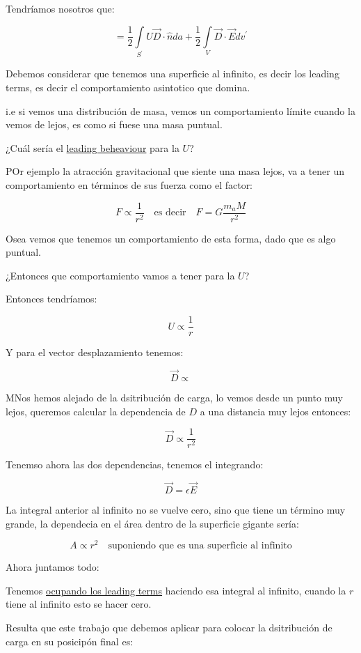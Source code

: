 \documentclass{article}
\begin{document}
Tendríamos nosotros que:


\[  = \frac{1}{2} \int\limits_{S^{\prime}} U\vec{D} \cdot \hat{n} da + \frac{1}{2} \int\limits_{V}\vec{D}\cdot \vec{E}dv^{\prime}  \]

Debemos considerar que tenemos una superficie al infinito, es decir los leading terms, es decir el comportamiento asintotico que domina. 

i.e si vemos una distribución de masa, vemos un comportamiento límite cuando la vemos de lejos, es como si fuese una masa puntual. 

¿Cuál sería el \underline{leading beheaviour} para la $U$?

POr ejemplo la atracción gravitacional que siente una masa lejos, va a tener un comportamiento en términos de sus fuerza como el factor:


\[  F \propto \frac{1}{r^{2}} \quad \text{es decir} \quad F = G \frac{m_{a}M}{r^{2}}  \]

Osea vemos que tenemos un comportamiento de esta forma, dado que es algo puntual.

¿Entonces que comportamiento vamos a tener para la $U$?

Entonces tendríamos:


\[ U \propto \frac{1}{r}  \]

Y para el vector desplazamiento tenemos:

\[  \vec{D} \propto  \]

MNos hemos alejado de la dsitribución de carga, lo vemos desde un punto muy lejos, queremos calcular la dependencia de $D$ a una distancia muy lejos entonces:


\[ \vec{D} \propto \frac{1}{r^{2}} \]

Tenemso ahora las dos dependencias, tenemos el integrando:


\[ \vec{D} = \epsilon \vec{E} \]

La integral anterior al infinito no se vuelve cero, sino que tiene un término muy grande, la dependecia en el área dentro de la superficie gigante sería:



\[  A \propto r^{2} \quad \text{suponiendo que es una superficie al infinito} \]

Ahora juntamos todo:


Tenemos \underline{ocupando los leading terms} haciendo esa integral al infinito, cuando la $r$ tiene al infinito esto se hacer cero.

Resulta que este trabajo que debemos aplicar para colocar la dsitribución de carga en su posicipón final es:
\end{document}
